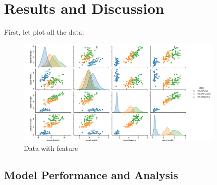 \documentclass[a4paper]{article}
\begin{document}
\section{Results and Discussion}
First, let plot all the data:
\begin{figure}[h]
	\centering
	\includegraphics[width=0.9\textwidth]{picture/data}
	\caption{Data with feature}
	\label{fig:example}
\end{figure}
\subsection{Model Performance and Analysis}
\end{document}
